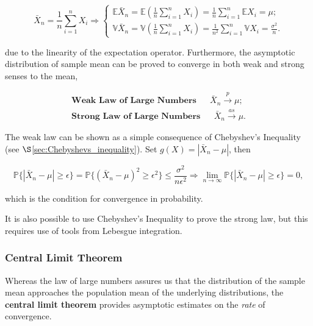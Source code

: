 \documentclass[12pt, twoside, draft]{article}
\begin{document}
\begin{equation}
\bar{X}_n = \frac{1}{n} \sum_{i=1}^n X_i \Rightarrow
\begin{cases}
\mathbb{E}\bar{X}_n = \mathbb{E} \left(\frac{1}{n} \sum_{i=1}^n X_i\right) = \frac{1}{n} \sum_{i=1}^n \mathbb{E} X_i = \mu; \\
\mathbb{V}\bar{X}_n = \mathbb{V} \left(\frac{1}{n} \sum_{i=1}^n X_i\right) = \frac{1}{n^2} \sum_{i=1}^n \mathbb{V}X_i = \frac{\sigma^2}{n}.
\end{cases}
\end{equation}

due to the linearity of the expectation operator.  Furthermore, the asymptotic distribution of sample mean can be proved to converge in both weak and strong senses to the mean,

\begin{align}
\textbf{Weak Law of Large Numbers      } \hspace{15pt} \bar{X}_n \stackrel{p}{\longrightarrow} \mu; \\
\textbf{Strong Law of Large Numbers    } \hspace{15pt} \bar{X}_n \stackrel{as}{\longrightarrow} \mu.
\end{align}

The weak law can be shown as a simple consequence of Chebyshev's Inequality (see $\S$\ref{sec:Chebyshevs_inequality}).  Set $g(X) = |\bar{X}_n - \mu|$, then

\begin{equation}
\mathbb{P}\{|\bar{X}_n - \mu| \geq \epsilon\} = \mathbb{P}\{ (\bar{X}_n - \mu)^2 \geq \epsilon^2 \}\leq \frac{\sigma^2}{n \epsilon^2} \Rightarrow \lim_{n\rightarrow\infty} \mathbb{P}\{|\bar{X}_n - \mu| \geq \epsilon\} = 0,
\end{equation}

which is the condition for convergence in probability.

It is also possible to use Chebyshev's Inequality to prove the strong law, but this requires use of tools from Lebesgue integration.

\subsubsection{Central Limit Theorem}\label{sec:central_limit_theorem}
Whereas the law of large numbers assures us that the distribution of the sample mean approaches the population mean of the underlying distributions, the \textbf{central limit theorem} provides asymptotic estimates on the \textit{rate} of convergence.
\end{document}
